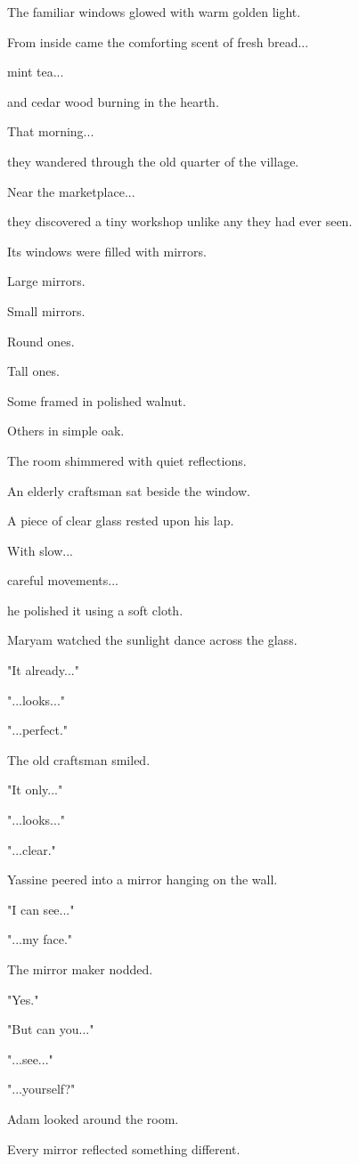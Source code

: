 \documentclass[12pt,openany]{book}
\begin{document}
The familiar windows glowed with warm golden light.

From inside came the comforting scent of fresh bread...

mint tea...

and cedar wood burning in the hearth.

That morning...

they wandered through the old quarter of the village.

Near the marketplace...

they discovered a tiny workshop unlike any they had ever seen.

Its windows were filled with mirrors.

Large mirrors.

Small mirrors.

Round ones.

Tall ones.

Some framed in polished walnut.

Others in simple oak.

The room shimmered with quiet reflections.

An elderly craftsman sat beside the window.

A piece of clear glass rested upon his lap.

With slow...

careful movements...

he polished it using a soft cloth.

Maryam watched the sunlight dance across the glass.

"It already..."

"...looks..."

"...perfect."

The old craftsman smiled.

"It only..."

"...looks..."

"...clear."

Yassine peered into a mirror hanging on the wall.

"I can see..."

"...my face."

The mirror maker nodded.

"Yes."

"But can you..."

"...see..."

"...yourself?"

Adam looked around the room.

Every mirror reflected something different.
\end{document}
